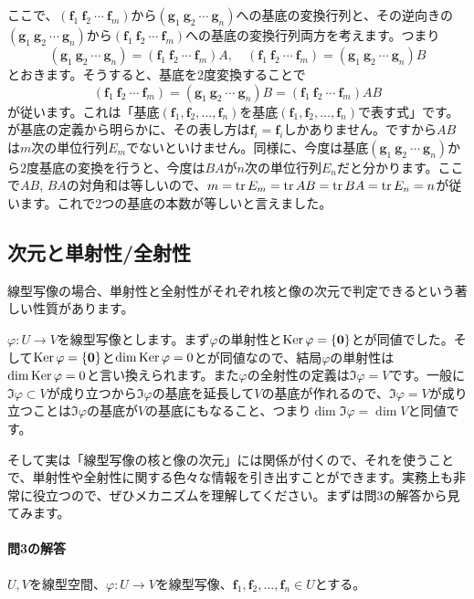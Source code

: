 ここで、$(\bm{f}_1 \  \bm{f}_2 \  \cdots \  \bm{f}_m )$から$(\bm{g}_1 \  \bm{g}_2 \  \cdots \  \bm{g}_n )$への基底の変換行列と、その逆向きの$(\bm{g}_1 \  \bm{g}_2 \  \cdots \  \bm{g}_n )$から$(\bm{f}_1 \  \bm{f}_2 \  \cdots \  \bm{f}_m )$への基底の変換行列両方を考えます。つまり
\[
(\bm{g}_1 \  \bm{g}_2 \  \cdots \  \bm{g}_n ) = (\bm{f}_1 \  \bm{f}_2 \  \cdots \  \bm{f}_m )A, \quad
(\bm{f}_1 \  \bm{f}_2 \  \cdots \  \bm{f}_m ) = (\bm{g}_1 \  \bm{g}_2 \  \cdots \  \bm{g}_n )B 
\]
とおきます。そうすると、基底を$2$度変換することで
\[
(\bm{f}_1 \  \bm{f}_2 \  \cdots \  \bm{f}_m ) = (\bm{g}_1 \  \bm{g}_2 \  \cdots \  \bm{g}_n )B
= (\bm{f}_1 \  \bm{f}_2 \  \cdots \  \bm{f}_m )AB
\]
が従います。これは「基底$(\bm{f}_1, \bm{f}_2, \ldots, \bm{f}_n)$を基底$(\bm{f}_1, \bm{f}_2, \ldots, \bm{f}_n)$で表す式」です。が基底の定義から明らかに、その表し方は$\bm{f}_i = \bm{f}_i$しかありません。ですから$AB$は$m$次の単位行列$E_m$でないといけません。同様に、今度は基底$(\bm{g}_1 \  \bm{g}_2 \  \cdots \  \bm{g}_n )$から$2$度基底の変換を行うと、今度は$BA$が$n$次の単位行列$E_n$だと分かります。ここで$AB$, $BA$の対角和は等しいので、$m = \operatorname{tr} E_m = \operatorname{tr} AB = \operatorname{tr} BA = \operatorname{tr} E_n = n$が従います。これで$2$つの基底の本数が等しいと言えました。

\subsection{次元と単射性/全射性}

線型写像の場合、単射性と全射性がそれぞれ核と像の次元で判定できるという著しい性質があります。

$\varphi\colon U\rightarrow V$を線型写像とします。まず$\varphi$の単射性と$\operatorname{Ker} \varphi = \{\boldsymbol{0}\}$とが同値でした。そして$\operatorname{Ker}\varphi = \{\boldsymbol{0}\}$と$\dim \operatorname{Ker}\varphi = 0$とが同値なので、結局$\varphi$の単射性は$\dim \operatorname{Ker}\varphi = 0$と言い換えられます。また$\varphi$の全射性の定義は$\Im \varphi = V$です。一般に$\Im \varphi\subset V$が成り立つから$\Im \varphi$の基底を延長して$V$の基底が作れるので、$\Im \varphi = V$が成り立つことは$\Im \varphi$の基底が$V$の基底にもなること、つまり$\dim \Im \varphi = \dim V$と同値です。

そして実は「線型写像の核と像の次元」には関係が付くので、それを使うことで、単射性や全射性に関する色々な情報を引き出すことができます。実務上も非常に役立つので、ぜひメカニズムを理解してください。まずは問3の解答から見てみます。

\paragraph{問3の解答}
$U, V$を線型空間、$\varphi\colon U\rightarrow V$を線型写像、$\bm{f}_1, \bm{f}_2, \ldots, \bm{f}_n\in U$とする。

